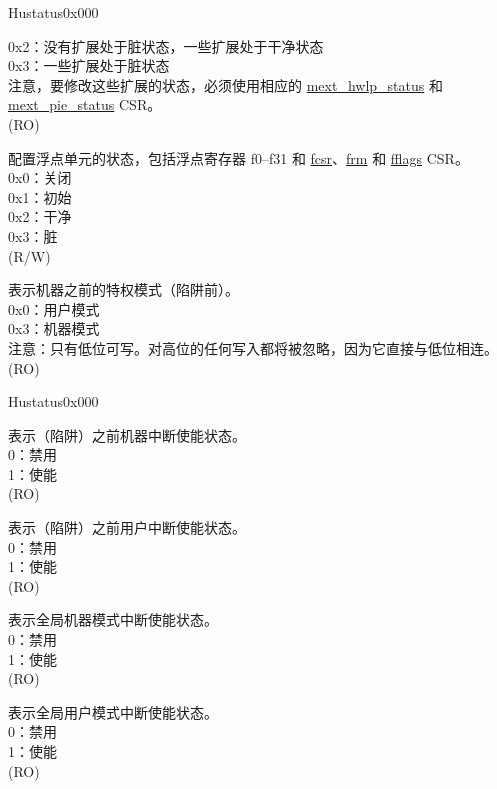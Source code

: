 \begin{register}{H}{ustatus}{0x000}
\begin{regdesc}
\begin{reglist}
0x2：没有扩展处于脏状态，一些扩展处于干净状态\\
0x3：一些扩展处于脏状态\\
注意，要修改这些扩展的状态，必须使用相应的 \hyperref[regdesc:MEXT_HWLP_STATUS]{mext\_hwlp\_status} 和 \hyperref[regdesc:MEXT_PIE_STATUS]{mext\_pie\_status} CSR。\\
(RO)
\label{fielddesc:USTATUS_FS}\item [FS] 配置浮点单元的状态，包括浮点寄存器 f0–f31 和 \hyperref[regdesc:FCSR]{fcsr}、\hyperref[regdesc:FCSR]{frm} 和 \hyperref[regdesc:FFLAGS]{fflags} CSR。\\
0x0：关闭\\
0x1：初始\\
0x2：干净\\
0x3：脏\\
(R/W)
\label{fielddesc:USTATUSMPP}\item [MPP] 表示机器之前的特权模式（陷阱前）。\\
0x0：用户模式\\
0x3：机器模式\\
注意：只有低位可写。对高位的任何写入都将被忽略，因为它直接与低位相连。\\
(RO)
\item [见下页……]
\end{reglist}\end{regdesc}
\end{register}
\addtocounter{Regfloat}{-1}
\begin{register}{H}{ustatus}{0x000}
\begin{regdesc}\begin{reglist}
\item [接上页……]
\label{fielddesc:USTATUSMPIE}\item [MPIE] 表示（陷阱）之前机器中断使能状态。\\
0：禁用\\
1：使能\\
(RO)
\label{fielddesc:USTATUSUPIE}\item [UPIE] 表示（陷阱）之前用户中断使能状态。\\
0：禁用\\
1：使能\\
(RO)
\label{fielddesc:USTATUSMIE}\item [MIE] 表示全局机器模式中断使能状态。\\
0：禁用\\
1：使能\\
(RO)
\label{fielddesc:USTATUSUIE}\item [UIE] 表示全局用户模式中断使能状态。\\
0：禁用\\
1：使能\\
(RO)
\end{reglist}\end{regdesc}
\end{register}

